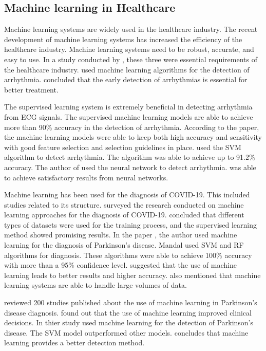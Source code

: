 \subsection{Machine learning in Healthcare}\label{subsec:machine_learning_in_healthcare}

Machine learning systems are widely used in the healthcare industry. The recent development of machine learning systems has increased the efficiency of the healthcare industry. Machine learning systems need to be robust, accurate, and easy to use. In a study conducted by \cite{ref_paper_4}, these three were essential requirements of the healthcare industry. \citeauthor{ref_paper_4} used machine learning algorithms for the detection of arrhythmia. \citeauthor{ref_paper_4} concluded that the early detection of arrhythmias is essential for better treatment.

The supervised learning system is extremely beneficial in detecting arrhythmia from ECG signals. The supervised machine learning models are able to achieve more than 90\% accuracy in the detection of arrhythmia. According to the \cite{ref_paper_28} paper, the machine learning models were able to keep both high accuracy and sensitivity with good feature selection and selection guidelines in place. \cite{ref_paper_38} used the SVM algorithm to detect arrhythmia. The algorithm was able to achieve up to 91.2\% accuracy. The author of \cite{ref_paper_16} used the neural network to detect arrhythmia. \citeauthor{ref_paper_16} was able to achieve satisfactory results from neural networks.

Machine learning has been used for the diagnosis of COVID-19. This included studies related to its structure. \cite{ref_paper_20} surveyed the research conducted on machine learning approaches for the diagnosis of COVID-19. \citeauthor{ref_paper_20} concluded that different types of datasets were used for the training process, and the supervised learning method showed promising results. In the paper \cite{ref_paper_34}, the author used machine learning for the diagnosis of Parkinson's disease. Mandal used SVM and RF algorithms for diagnosis. These algorithms were able to achieve 100\% accuracy with more than a 95\% confidence level. \cite{ref_paper_15} suggested that the use of machine learning leads to better results and higher accuracy. \citeauthor{ref_paper_15} also mentioned that machine learning systems are able to handle large volumes of data.

\cite{ref_paper_27} reviewed 200 studies published about the use of machine learning in Parkinson's disease diagnosis. \cite{ref_paper_27} found out that the use of machine learning improved clinical decisions. In thier study \cite{ref_paper_30} used machine learning for the detection of Parkinson's disease. The SVM model outperformed other models. \cite{ref_paper_30} concludes that machine learning provides a better detection method.

